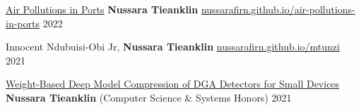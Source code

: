\begin{cventries}
\cvpub
      { \href{https://nussarafirn.github.io/air-pollutions-in-ports}{Air Pollutions in Ports}} %
    {\textbf{Nussara Tieanklin}} %
    { \href{https://nussarafirn.github.io/air-pollutions-in-ports}{nussarafirn.github.io/air-pollutions-in-ports}} %
    {2022} %

\cvpub
    {} %
    {Innocent Ndubuisi-Obi Jr, \textbf{Nussara Tieanklin}} %
    { \href{https://nussarafirn.github.io/mtunzi}{nussarafirn.github.io/mtunzi}} %
    {2021} %

\cvpub
        {\href{https://www.tacoma.uw.edu/sites/default/files/2021-08/tieanklin_nussara_senior_thesis-2021.pdf}{Weight-Based Deep Model Compression of DGA Detectors for Small Devices}} %
        {\textbf{Nussara Tieanklin} (Computer Science \& Systems Honors)} 
        {} %
        {2021} %
\end{cventries}
